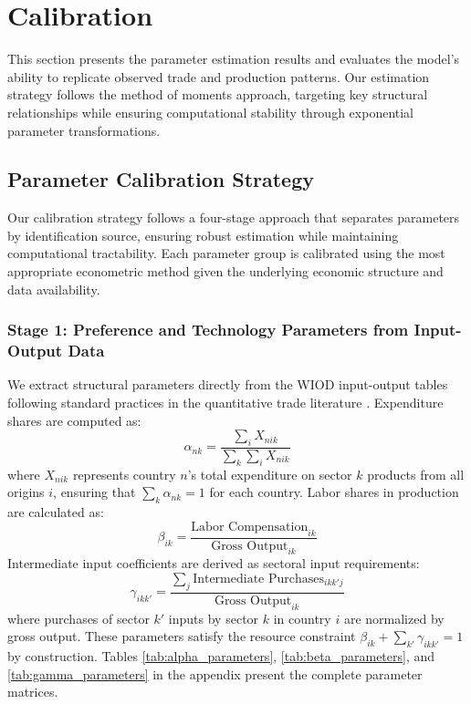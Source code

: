 \section{Calibration}

This section presents the parameter estimation results and evaluates the model's ability to replicate observed trade and production patterns. Our estimation strategy follows the method of moments approach, targeting key structural relationships while ensuring computational stability through exponential parameter transformations.

\subsection{Parameter Calibration Strategy}

Our calibration strategy follows a four-stage approach that separates parameters by identification source, ensuring robust estimation while maintaining computational tractability. Each parameter group is calibrated using the most appropriate econometric method given the underlying economic structure and data availability.

\subsubsection{Stage 1: Preference and Technology Parameters from Input-Output Data}

We extract structural parameters directly from the WIOD input-output tables following standard practices in the quantitative trade literature \citep{costinot2012TheReviewofEconomicStudies}. Expenditure shares are computed as:
\begin{equation}
\alpha_{nk} = \frac{\sum_i X_{nik}}{\sum_k \sum_i X_{nik}}
\end{equation}
where $X_{nik}$ represents country $n$'s total expenditure on sector $k$ products from all origins $i$, ensuring that $\sum_k \alpha_{nk} = 1$ for each country. Labor shares in production are calculated as:
\begin{equation}
\beta_{ik} = \frac{\text{Labor Compensation}_{ik}}{\text{Gross Output}_{ik}}
\end{equation}
Intermediate input coefficients are derived as sectoral input requirements:
\begin{equation}
\gamma_{ikk'} = \frac{\sum_j \text{Intermediate Purchases}_{ikk'j}}{\text{Gross Output}_{ik}}
\end{equation}
where purchases of sector $k'$ inputs by sector $k$ in country $i$ are normalized by gross output. These parameters satisfy the resource constraint $\beta_{ik} + \sum_{k'} \gamma_{ikk'} = 1$ by construction. Tables \ref{tab:alpha_parameters}, \ref{tab:beta_parameters}, and \ref{tab:gamma_parameters} in the appendix present the complete parameter matrices.

